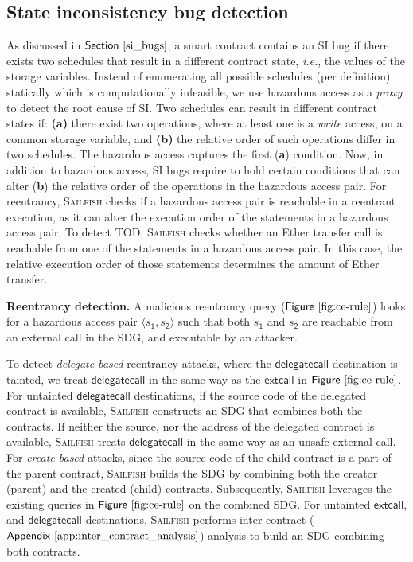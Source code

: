 \documentclass[conference, romanappendices]{tex/IEEEtran}
\theoremstyle{bfnote}
\newcommand{\toolname}{\textsc{Sailfish}\xspace}
\newcommand{\smart}{smart contract}
\newcommand{\ether}{{Ether}\xspace}
\newcommand{\reentrancy}{{reentrancy}\xspace}
\newcommand{\haz}{{hazardous access}\xspace}
\newcommand{\ie}{\textit{i.e.}}
\newcommand{\Fig}[1]{\ensuremath{\sf Figure~\ref{#1}}}
\newcommand{\Sect}[1]{\ensuremath{\sf Section~\ref{#1}}}
\newcommand{\Appen}[1]{\ensuremath{\sf Appendix~\ref{#1}}}
\begin{document}
\subsection{\textbf{State inconsistency bug detection}}
\label{sec:si_bug_detection}
As discussed in \Sect{si_bugs}, a \smart{} contains an SI bug if there exists two schedules that result in a different contract state, \ie, the values of the storage variables.
Instead of enumerating all possible schedules (per definition) statically which is computationally infeasible, we use \haz as a \textit{proxy} to detect the root cause of SI.
Two schedules can result in different contract states if:
\textbf{(a)} there exist two operations, where at least one is a \textit{write} access, on a common storage variable, and 
\textbf{(b)} the relative order of such operations differ in two schedules.
The \haz captures the first (\textbf{a}) condition.
Now, in addition to hazardous access, SI bugs require to hold certain conditions that can alter (\textbf{b}) the relative order of the operations in the \haz pair.
For \reentrancy, \toolname checks if a hazardous access pair is reachable in a reentrant execution, as it can alter the execution order of the statements in a hazardous access pair.
To detect {TOD\EndAccSupp{}}, \toolname checks whether an \ether transfer call is reachable from one of the statements in a hazardous access pair.
In this case, the relative execution order of those statements determines the amount of \ether transfer.

\noindent
\textbf{Reentrancy detection.}
A malicious \reentrancy query (\Fig{fig:ce-rule}) 
looks for a hazardous access pair $\langle s_{\mathsf{1}}, s_{\mathsf{2}} \rangle$ such that both $s_{\mathsf{1}}$ and $s_{\mathsf{2}}$ are reachable from an external call in the {SDG\EndAccSupp{}}, and executable by an attacker.

To detect \textit{delegate-based} \reentrancy attacks, where the $\mathsf{delegatecall}$ destination is tainted, we treat $\mathsf{delegatecall}$ in the same way as the  $\mathsf{extcall}$ in \Fig{fig:ce-rule}.
For untainted $\mathsf{delegatecall}$ destinations, if the source code of the delegated contract is available, \toolname constructs an {SDG\EndAccSupp{}} that combines both the contracts.
If neither the source, nor the address of the delegated contract is available, \toolname treats $\mathsf{delegatecall}$ in the same way as an unsafe external call.
For \textit{create-based} attacks, since the source code of the child contract is a part of the parent contract, \toolname builds the {SDG\EndAccSupp{}} by combining both the {creator\EndAccSupp{}} (parent) and the created (child) contracts.
Subsequently, \toolname leverages the existing queries in \Fig{fig:ce-rule} on the combined SDG.
For untainted $\mathsf{extcall}$, and $\mathsf{delegatecall}$ destinations, \toolname performs inter-contract (\Appen{app:inter_contract_analysis}) analysis to build an {SDG\EndAccSupp{}} combining both contracts.
\end{document}
